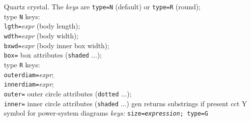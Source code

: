  {Quartz crystal. The {\sl keys} are
     {\tt type=N} (default) or {\tt type=R} (round);\\
            type {\tt N} keys:\\
              {\tt lgth=}{\sl expr} (body length);\\
              {\tt wdth=}{\sl expr} (body width);\\
              {\tt bxwd=}{\sl expr} (body inner box width);\\
              {\tt box=} box attributes ({\tt shaded} $\ldots$);\\
            type {\tt R} keys:\\
              {\tt outerdiam=}{\sl expr};\\
              {\tt innerdiam=}{\sl expr};\\
              {\tt outer=} outer circle attributes ({\tt dotted} $\ldots$);\\
              {\tt inner=} inner circle attributes ({\tt shaded} $\ldots$)%
}%
%
  {gen}%
  {returns substrings if present}%
%
%
  {cct}%
  {Y symbol for power-system diagrams
   {\sl keys:} {\tt size={\sl expression}; type=G}}%
